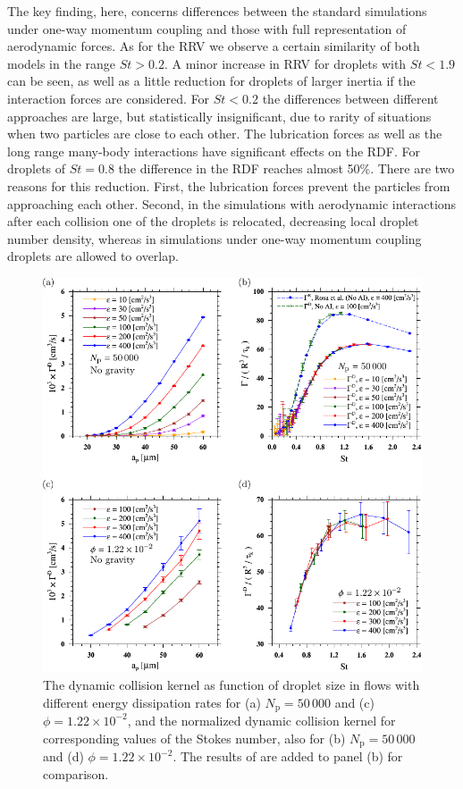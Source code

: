 \documentclass[../thesis.tex]{subfiles}
\begin{document}
The key finding, here, concerns differences between the standard simulations under one-way momentum coupling and those with full representation of aerodynamic forces. As for the RRV we observe a certain similarity of both models in the range $St>0.2$. A minor increase in RRV for droplets with $St<1.9$ can be seen, as well as a little reduction for droplets of larger inertia if the interaction forces are considered. For $St<0.2$ the differences between different approaches are large, but statistically insignificant, due to rarity of situations when two particles are close to each other. The lubrication forces as well as the long range many-body interactions have significant effects on the RDF. For droplets of $St=0.8$ the difference in the RDF reaches almost 50\%. There are two reasons for this reduction. First, the lubrication forces prevent the particles from approaching each other. Second, in the simulations with aerodynamic interactions after each collision one of the droplets is relocated, decreasing local droplet number density, whereas in simulations under one-way momentum coupling droplets are allowed to overlap.

\begin{figure}%
\center
\includegraphics[width=\textwidth]{../figs/JFM/fig11.pdf}
\caption{The dynamic collision kernel as function of droplet size in flows with different energy dissipation rates for (a) $N_\mathrm{p} = 50\,000$ and (c) $\phi = 1.22\times10^{-2}$, and the normalized dynamic collision kernel for corresponding values of the Stokes number, also for (b) $N_\mathrm{p} = 50\,000$ and (d) $\phi = 1.22\times10^{-2}$. The results of \cite{RPAGW13} are added to panel (b) for comparison.}
\label{Fig11}
\end{figure}%
\end{document}
